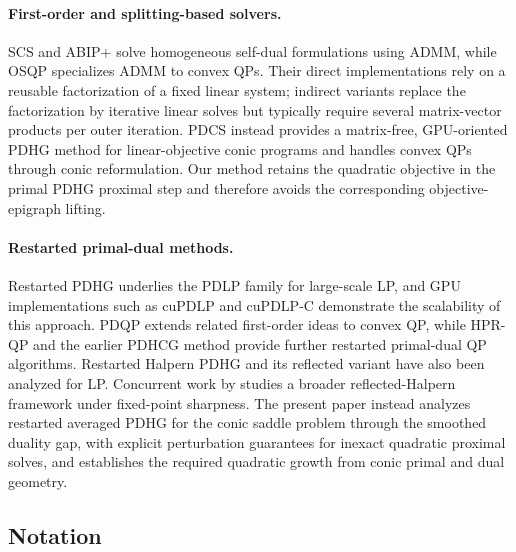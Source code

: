 \documentclass[letterpaper]{article} %
\theoremstyle{definition}
\theoremstyle{remark}
\begin{document}
\paragraph{First-order and splitting-based solvers.}
SCS \cite{o2016conic,scs} and ABIP+ \cite{lin2021admm,deng2025enhanced} solve homogeneous
self-dual formulations using ADMM, while OSQP \cite{stellato2020osqp}
specializes ADMM to convex QPs.  Their direct
implementations rely on a reusable factorization of a fixed linear system;
indirect variants replace the factorization by iterative linear solves but
typically require several matrix-vector products per outer iteration.  PDCS \cite{lin2025pdcs} instead provides a matrix-free, GPU-oriented PDHG
method for linear-objective conic programs and handles convex QPs through
conic reformulation.  Our method retains the quadratic objective in the
primal PDHG proximal step and therefore avoids the corresponding
objective-epigraph lifting.

\paragraph{Restarted primal-dual methods.}
Restarted PDHG underlies the PDLP family \cite{applegate2021practical}
for large-scale LP, and GPU implementations such as cuPDLP
\cite{lu2023cupdlp} and cuPDLP-C\cite{lu2023cupdlpc} demonstrate the scalability of this approach.  PDQP \cite{lu2023practical} extends related first-order ideas to convex
QP, while HPR-QP \cite{chen2025hpr} and the earlier PDHCG method
\cite{huang2025restarted} provide further restarted primal-dual QP
algorithms.  Restarted Halpern PDHG and its reflected variant \cite{lu2024restarted}
have also been analyzed for LP.  Concurrent work by
\cite{liu2026reflected} studies a broader reflected-Halpern framework under
fixed-point sharpness.  The present paper instead analyzes restarted
averaged PDHG for the conic saddle problem through the smoothed duality
gap, with explicit perturbation guarantees for inexact quadratic proximal
solves, and establishes the required quadratic growth from conic primal and
dual geometry.

\subsection{Notation}
\end{document}
